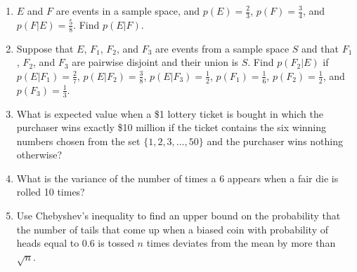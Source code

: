 \documentclass[letterpaper, 12pt]{article}
\begin{document}
\begin{enumerate}
    \item $E$ and $F$ are events in a sample space, and $p(E) = \frac{2}{3}$, $p(F) = \frac{3}{4}$, and $p(F|E) = \frac{5}{8}$. Find $p(E|F)$.
    \item Suppose that $E$, $F_1$, $F_2$, and $F_3$ are events from a sample space $S$ and that $F_1$, $F_2$, and $F_3$ are pairwise disjoint and their union is $S$. Find $p(F_2|E)$ if $p(E|F_1) = \frac{2}{7}$, $p(E|F_2) = \frac{3}{8}$, $p(E|F_3) = \frac{1}{2}$, $p(F_1) = \frac{1}{6}$, $p(F_2) = \frac{1}{2}$, and $p(F_3) = \frac{1}{3}$.
    \item What is expected value when a \$1 lottery ticket is bought in which the purchaser wins exactly \$10 million if the ticket contains the six winning numbers chosen from the set $\{1, 2, 3, \ldots, 50\}$ and the purchaser wins nothing otherwise?
    \item What is the variance of the number of times a 6 appears when a fair die is rolled 10 times?
    \item Use Chebyshev's inequality to find an upper bound on the probability that the number of tails that come up when a biased coin with probability of heads equal to 0.6 is tossed $n$ times deviates from the mean by more than $\sqrt{n}$.
\end{enumerate}
\end{document}
